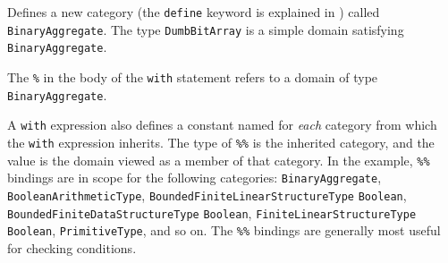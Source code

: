 Defines a new category (the {\tt define} keyword is explained in
) called {\tt BinaryAggregate}.
The type {\tt DumbBitArray} is a simple domain satisfying
{\tt BinaryAggregate}.

The {\tt \%} in the body of the {\tt with} statement refers to a
domain of type {\tt BinaryAggregate}.

A \verb"with" expression also defines a constant named \ttin{\%\%} for
{\em each} category from which the {\tt with} expression inherits. The
type of {\tt \%\%} is the inherited category, and the value is the
domain viewed as a member of that category.  In the example, {\tt \%\%}
bindings are in scope for the following categories:
{\tt BinaryAggregate},
{\tt BooleanArithmeticType},
{\tt BoundedFiniteLinearStructureType} {\tt Boolean},
{\tt BoundedFiniteDataStructureType} {\tt Boolean},
{\tt FiniteLinearStructureType} {\tt Boolean},
{\tt PrimitiveType}, and so on. The {\tt \%\%} bindings are generally most useful for
checking conditions.




\label{asugLangNamesComma}

